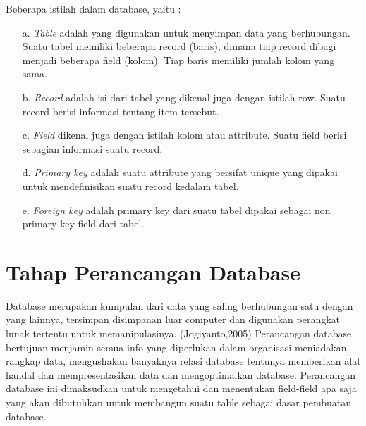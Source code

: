 \documentclass{jtetiproposalskripsi}
\begin{document}
Beberapa istilah dalam database, yaitu :
\begin{itemize}
\item[a.]\textit{Table} adalah yang digunakan untuk menyimpan data yang berhubungan. Suatu tabel memiliki beberapa record (baris), dimana tiap record dibagi menjadi beberapa field (kolom). Tiap baris memiliki jumlah kolom yang sama. 
\item[b.]\textit{Record} adalah isi dari tabel yang dikenal juga dengan istilah row. Suatu record berisi informasi tentang item tersebut.
\item[c.]\textit{Field}  dikenal  juga  dengan  istilah  kolom  atau  attribute.  Suatu  field  berisi  sebagian informasi suatu record.
\item[d.]\textit{Primary   key}   adalah   suatu   attribute   yang   bersifat   unique   yang   dipakai   untuk mendefinisikan suatu record kedalam tabel.
\item[e.]\textit{Foreign key} adalah primary key dari suatu tabel dipakai sebagai non primary key field dari tabel.
\end{itemize}


\section{Tahap Perancangan Database}
Database merupakan kumpulan dari data yang saling berhubungan satu dengan yang lainnya, tersimpan disimpanan luar computer dan digunakan perangkat lunak tertentu untuk memanipulasinya. (Jogiyanto,2005)
Perancangan database bertujuan menjamin semua info yang diperlukan dalam organisasi meniadakan rangkap data, mengushakan banyaknya relasi database tentunya memberikan alat  handal  dan  mempresentasikan  data  dan  mengoptimalkan  database.  Perancangan database ini dimaksudkan untuk mengetahui dan menentukan field-field apa saja yang akan dibutuhkan untuk membangun suatu table sebagai dasar pembuatan database.
\end{document}
